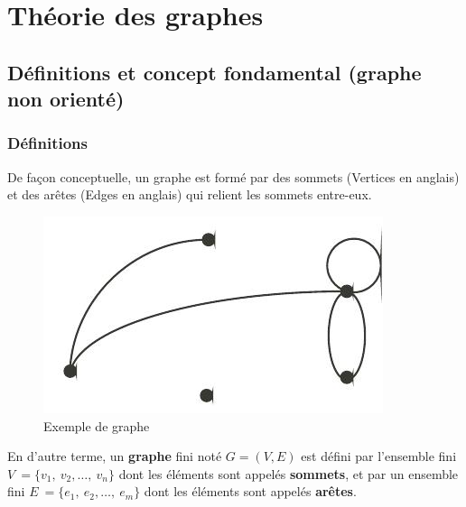 \chapter{Théorie des graphes}
\section{Définitions et concept fondamental (graphe non orienté)}
\subsection{Définitions}
\noindent De façon conceptuelle, un graphe est formé par des sommets (Vertices en anglais) et des arêtes (Edges en anglais) 
qui relient les sommets entre-eux.

\begin{figure}[h]
\centering
\includegraphics[width=0.5\linewidth]{images/graph}
\caption[Exemple d'un graphe]{Exemple de graphe}
\label{fig:graph}
\end{figure}

\noindent En d'autre terme, un \textbf{graphe} fini noté $G=(V,E)$ est défini par l'ensemble fini $V\ = \{v_{1},\ v_{2},\dots,\ v_{n} \}$ 
dont les éléments sont appelés \textbf{sommets}, 
et par un ensemble fini 
$ E\ = \{ e_{1},\ e_{2},\dots ,\ e_{m} \} $
dont les éléments sont appelés \textbf{arêtes}.

